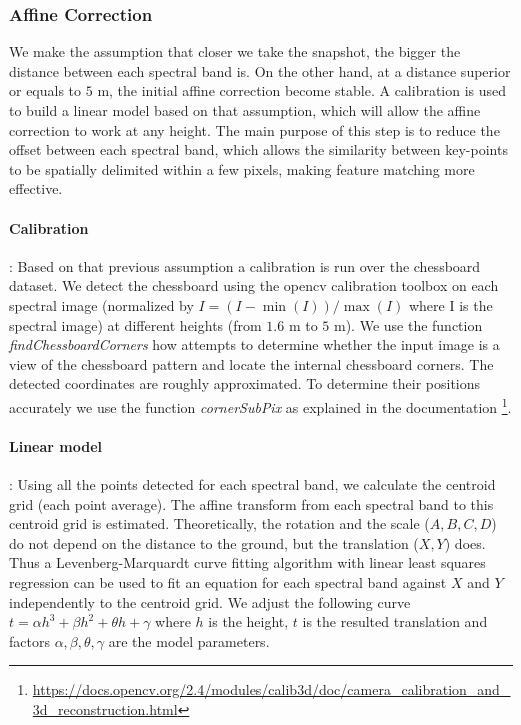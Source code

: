 \documentclass[a4paper,twoside]{article}
\begin{document}
	\subsubsection{Affine Correction}
	\label{sec:affine}
	
	We make the assumption that closer we take the snapshot, the bigger the distance between each spectral band is. %
	On the other hand, at a distance superior or equals to $5$ m, the initial affine correction become stable. %
	A calibration is used to build a linear model based on that assumption, which will allow the affine correction to work at any height.
	The main purpose of this step is to reduce the offset between each spectral band,
	which allows the similarity between key-points to be spatially delimited within a few pixels, making feature matching more effective.
	
	\paragraph{Calibration} :
	Based on that previous assumption a calibration is run over the chessboard dataset.
	We detect the chessboard using the opencv calibration toolbox \cite{Bouguet2001CameraCT}
	on each spectral image (normalized by $I = (I-\min(I))/\max(I)$ where I is the spectral image) at different heights (from $1.6$ m to $5$ m).
	We use the function \textit{findChessboardCorners} how attempts to determine whether the input image is a view of the chessboard pattern and locate the internal chessboard corners.
	The detected coordinates are roughly approximated. To determine their positions accurately we use the function \textit{cornerSubPix} as explained in the documentation \footnote{\url{https://docs.opencv.org/2.4/modules/calib3d/doc/camera_calibration_and_3d_reconstruction.html}}.
	
	\paragraph{Linear model} :
	Using all the points detected for each spectral band, we calculate the centroid grid (each point average).
	The affine transform from each spectral band to this centroid grid is estimated.
	Theoretically, the rotation and the scale ($A,B,C,D$) do not depend on the distance to the ground, but the translation ($X,Y$) does.
	Thus a Levenberg-Marquardt curve fitting algorithm with linear least squares regression \cite{More78}
	can be used to fit an equation for each spectral band against $X$ and $Y$ independently to the centroid grid.
	We adjust the following curve $t = \alpha h^3 + \beta h^2 + \theta h + \gamma$ where $h$ is the height,
	$t$ is the resulted translation and factors $\alpha,\beta,\theta,\gamma$ are the model parameters.
	
\end{document}
